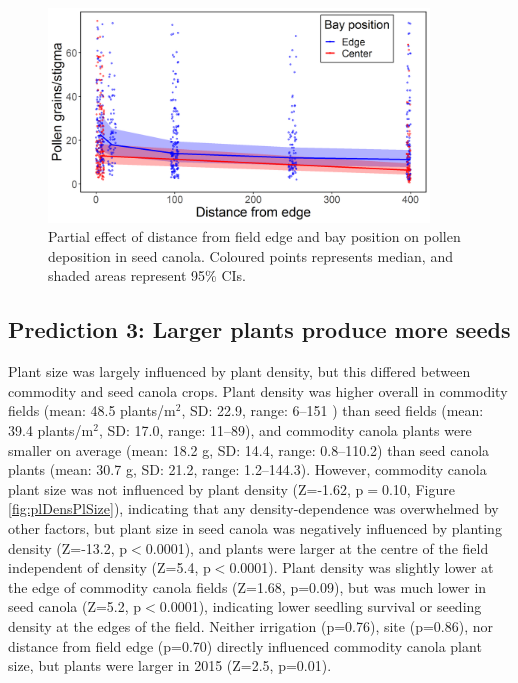 \documentclass[12pt]{article} %
\begin{document}
\begin{figure} 
    \centering
    \includegraphics[width=0.9\textwidth,keepaspectratio=true]{slopeDistCentPol.png}
    \caption[Partial effect of distance from field edge and bay position on pollen deposition in seed canola]{Partial effect of distance from field edge and bay position on pollen deposition in seed canola. Coloured points represents median, and shaded areas represent 95\% CIs.}
    \label{fig:distCentPol}
\end{figure}

\subsection{Prediction 3: Larger plants produce more seeds} 

Plant size was largely influenced by plant density, but this differed between commodity and seed canola crops.
Plant density was higher overall in commodity fields (mean: 48.5 plants/m$^2$, SD: 22.9, range: 6--151 ) than seed fields (mean: 39.4 plants/m$^2$, SD: 17.0, range: 11--89), and commodity canola plants were smaller on average (mean: 18.2 g, SD: 14.4, range: 0.8--110.2) than seed canola plants (mean: 30.7 g, SD: 21.2, range: 1.2--144.3).
However, commodity canola plant size was not influenced by plant density (Z=-1.62, p$=$0.10, Figure \ref{fig:plDensPlSize}), indicating that any density-dependence was overwhelmed by other factors, but plant size in seed canola was negatively influenced by planting density (Z=-13.2, p$<$0.0001), and plants were larger at the centre of the field independent of density (Z=5.4, p$<$0.0001).%
Plant density was slightly lower at the edge of commodity canola fields (Z=1.68, p=0.09), but was much lower in seed canola (Z=5.2, p$<$0.0001), indicating lower seedling survival or seeding density at the edges of the field.
Neither irrigation (p=0.76), site (p=0.86), nor distance from field edge (p=0.70) directly influenced commodity canola plant size, but plants were larger in 2015 (Z=2.5, p=0.01). 
\end{document}
